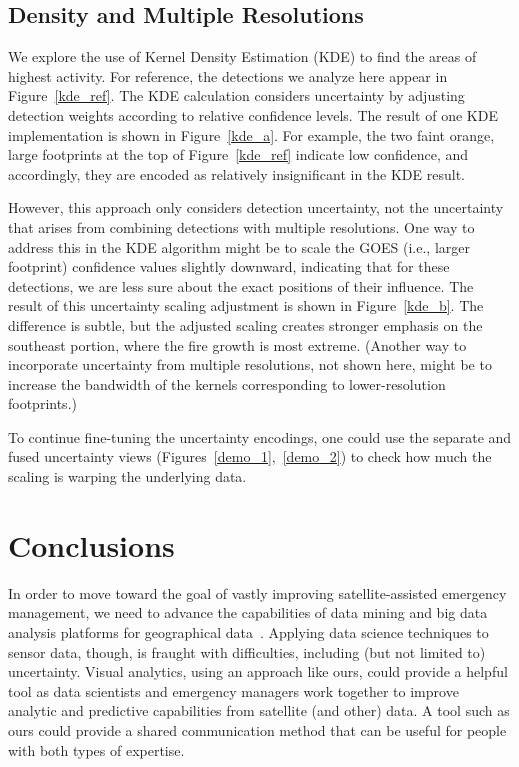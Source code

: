 \subsection{Density and Multiple Resolutions}
\label{kde}
We explore the use of Kernel Density Estimation (KDE) to find the areas of highest activity. For reference, the detections we analyze here appear in Figure~\ref{kde_ref}. The KDE calculation considers uncertainty by adjusting detection weights according to relative confidence levels. The result of one KDE implementation is shown in Figure~\ref{kde_a}. For example, the two faint orange, large footprints at the top of Figure~\ref{kde_ref} indicate low confidence, and accordingly, they are encoded as relatively insignificant in the KDE result. 

However, this approach only considers detection uncertainty, not the uncertainty that arises from combining detections with multiple resolutions. One way to address this in the KDE algorithm might be to scale the GOES (i.e., larger footprint) confidence values slightly downward, indicating that for these detections, we are less sure about the exact positions of their influence. The result of this uncertainty scaling adjustment is shown in Figure~\ref{kde_b}. The difference is subtle, but the adjusted scaling creates stronger emphasis on the southeast portion, where the fire growth is most extreme. (Another way to incorporate uncertainty from multiple resolutions, not shown here, might be to increase the bandwidth of the kernels corresponding to lower-resolution footprints.)

To continue fine-tuning the uncertainty encodings, one could use the separate and fused uncertainty views (Figures~\ref{demo_1},~\ref{demo_2}) to check how much the scaling is warping the underlying data. 


\section{Conclusions}
In order to move toward the goal of vastly improving satellite-assisted emergency management, we need to advance the capabilities of data mining and big data analysis platforms for geographical data~\cite{Voigt2016}. Applying data science techniques to sensor data, though, is fraught with difficulties, including (but not limited to) uncertainty. Visual analytics, using an approach like ours, could provide a helpful tool as data scientists and emergency managers work together to improve analytic and predictive capabilities from satellite (and other) data. A tool such as ours could provide a shared communication method that can be useful for people with both types of expertise.

